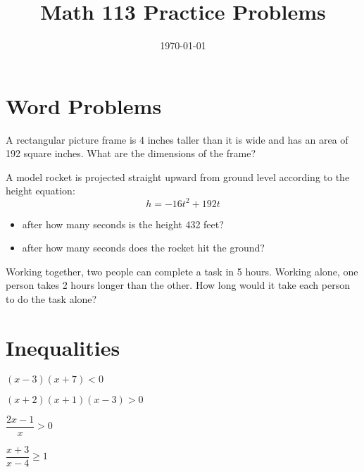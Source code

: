 \documentclass[fleqn,addpoints]{exam}
\title{Math 113 Practice Problems}
\author{}
\date{\today}
\begin{document}
\maketitle

\section{Word Problems}

\begin{questions}

\question 
A rectangular picture frame is 4 inches taller than it is wide and has an area of 192 square inches.  What are the dimensions of the
frame?
\vspace{4 cm}


\question 
A model rocket is projected straight upward from ground level according to the height equation:
\[
  h = -16t^2 + 192t
\]

\begin{itemize}
  \item after how many seconds is the height 432 feet?
  \item after how many seconds does the rocket hit the ground?
\end{itemize}
\vspace{4 cm}

\question 
Working together, two people can complete a task in 5 hours.  Working alone, one person takes 2 hours longer than the
other.  How long would it take each person to do the task alone?

\vspace{4 cm}

\section{Inequalities}

\question \( (x-3)(x+7) < 0 \)
\vspace{5 cm}

\question \( (x+2)(x+1)(x-3) > 0 \)
\vspace{5 cm}

\question \( \dfrac{2x-1}{x} > 0 \)
\vspace{5 cm}

\question \( \dfrac{x+3}{x-4} \geq 1 \)
\vspace{5 cm}

\end{questions}
\end{document}
